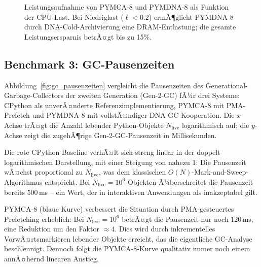 ﻿\documentclass[a4paper,12pt]{article}
\theoremstyle{definition}
\begin{document}
\begin{figure}[H]
  \centering
  \caption{Leistungsaufnahme von PYMCA-8 und PYMDNA-8 als Funktion der CPU-Last.
    Bei Niedriglast ($\ell < 0.2$) ermÃ¶glicht PYMDNA-8 durch DNA-Cold-Archivierung
    eine DRAM-Entlastung; die gesamte Leistungsersparnis betrÃ¤gt bis zu 15\%.}
  \label{fig:energie_vergleich}
\end{figure}

\subsection{Benchmark 3: GC-Pausenzeiten}

Abbildung~\ref{fig:gc_pausenzeiten} vergleicht die Pausenzeiten des Generational-Garbage-Collectors der zweiten Generation (Gen-2-GC) fÃ¼r drei Systeme: CPython als unverÃ¤nderte Referenzimplementierung, PYMCA-8 mit PMA-Prefetch und PYMDNA-8 mit vollstÃ¤ndiger DNA-GC-Kooperation. Die $x$-Achse trÃ¤gt die Anzahl lebender Python-Objekte $N_{\mathrm{live}}$ logarithmisch auf; die $y$-Achse zeigt die zugehÃ¶rige Gen-2-GC-Pausenzeit in Millisekunden.

Die rote CPython-Baseline verhÃ¤lt sich streng linear in der doppelt-logarithmischen Darstellung, mit einer Steigung von nahezu $1$: Die Pausenzeit wÃ¤chst proportional zu $N_{\mathrm{live}}$, was dem klassischen $O(N)$-Mark-and-Sweep-Algorithmus entspricht. Bei $N_{\mathrm{live}} = 10^6$ Objekten Ã¼berschreitet die Pausenzeit bereits $500$\,ms -- ein Wert, der in interaktiven Anwendungen als inakzeptabel gilt.

PYMCA-8 (blaue Kurve) verbessert die Situation durch PMA-gesteuertes Prefetching erheblich: Bei $N_{\mathrm{live}} = 10^6$ betrÃ¤gt die Pausenzeit nur noch $120$\,ms, eine Reduktion um den Faktor $\approx 4$. Dies wird durch inkrementelles VorwÃ¤rtsmarkieren lebender Objekte erreicht, das die eigentliche GC-Analyse beschleunigt. Dennoch folgt die PYMCA-8-Kurve qualitativ immer noch einem annÃ¤hernd linearen Anstieg.
\end{document}
